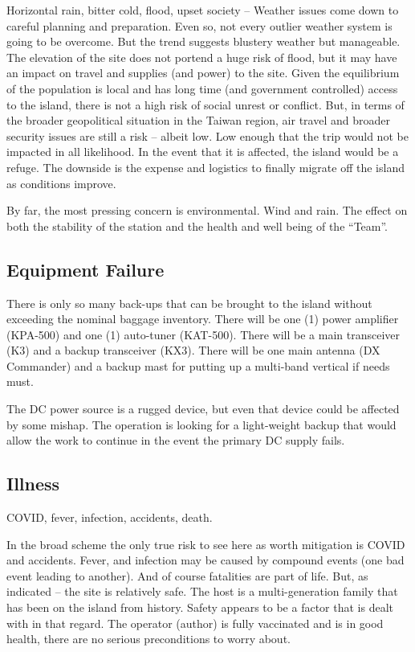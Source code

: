 \documentclass[11pt]{article}
\begin{document}
Horizontal rain, bitter cold, flood, upset society --  Weather issues
come down to careful planning and preparation.  Even so, not every outlier
weather system is going to be overcome.  But the trend suggests
blustery weather but manageable.   The elevation of the site does not
portend a huge risk of flood, but it may have an impact on travel and
supplies (and power) to the site.   Given the equilibrium of the population
is local and has long time (and government controlled) access to the island,
there is not a high risk of social unrest or conflict.   But, in terms
of the broader geopolitical situation in the Taiwan region, air travel
and broader security issues are still a risk -- albeit low.  Low enough 
that the trip would not be impacted in all likelihood.  In the event
that it is affected, the island would be a refuge.  The downside is the 
expense and logistics to finally migrate off the island as conditions
improve.
\par
By far, the most pressing concern is environmental.  Wind and rain.  The 
effect on both the stability of the station and the health and well being
of the ``Team''.


\subsection{Equipment Failure}
  There is only so many back-ups that can be
brought to the island without exceeding the nominal baggage inventory.
There will be one (1) power amplifier (KPA-500) and one (1) auto-tuner
(KAT-500).  There will be a main transceiver (K3) and a backup
transceiver (KX3).  There will be one main antenna (DX Commander)
and a backup mast for putting up a multi-band vertical if needs must.
\par
The DC power source is a rugged device, but even that device could
be affected by some mishap.  The operation is looking for a light-weight
backup that would allow the work to continue in the event the primary
DC supply fails.

\subsection{Illness}
COVID, fever, infection, accidents, death.

\par
In the
broad scheme the only true risk to see here as worth mitigation is
COVID and accidents.  Fever, and infection may be caused by compound
events (one bad event leading to another).  And of course fatalities 
are part of life.  But, as indicated -- the site is relatively 
safe.  The host is a multi-generation family that has been
on the island from history.   Safety appears to be a factor that is
dealt with in that regard.   The operator (author) is fully vaccinated
and is in good health, there are no serious preconditions to worry about.
\end{document}
